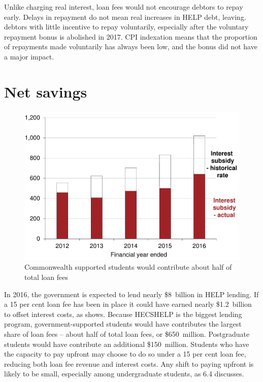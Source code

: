 \documentclass[embargoed]{grattan}
\begin{document}
{Unlike charging real interest, loan fees would not encourage debtors to repay early.
Delays in repayment do not mean real increases in \gls{HELP} debt, leaving. debtors with little incentive to repay voluntarily, especially after the voluntary repayment bonus is abolished in 2017.
\gls{CPI} indexation means that the proportion of repayments made voluntarily has always been low, and the bonus did not have a major impact.

\section{Net savings}\label{net-savings}

\begin{figure}
\caption{Commonwealth supported students would contribute about half of total loan fees}\label{fig:fig23-Cth-supported-students-would-contr-half-tot-loan-fees}


\includegraphics[page=23]{atlas/Chartpack.pdf}

\end{figure}

In 2016, the government is expected to lend nearly \$8~billion in \gls{HELP} lending.
If a 15 per cent loan fee has been in place it could have earned nearly \$1.2~billion to offset interest costs, as  shows.
Because \gls{HECSHELP} is the biggest lending program, government-supported students would have contributes the largest share of loan fees -- about half of total loan fees, or \$650~million.
Postgraduate students would have contribute an additional \$150~million.
Students who have the capacity to pay upfront may choose to do so under a 15 per cent loan fee, reducing both loan fee revenue and interest costs.
Any shift to paying upfront is likely to be small, especially among undergraduate students, as 6.4 discusses.

}
\end{document}
